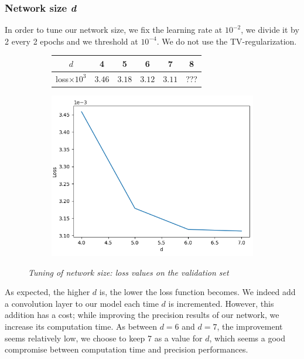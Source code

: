 \documentclass{article}
\begin{document}
        \subsubsection{Network size \textit{d}}
            \label{par:hpp-d}
            In order to tune our network size, we fix the learning rate at $10^{-2}$, we divide it by 2 every 2 epochs and we threshold at $10^{-4}$. We do not use the TV-regularization.

            \begin{figure}[!ht]
                \begin{subfigure}{.4\linewidth}
                    \centering
                    \begin{tabular}{|c|c|c|c|c|c|}
                        \hline
                        $d$ & 4 & 5 & 6 & 7 & 8 \\
                        \hline \hline
                        loss$\times 10^3$ & $3.46$ & $3.18$ & $3.12$ & $3.11$ & ??? \\
                        \hline
                    \end{tabular}
                \end{subfigure}
                \begin{subfigure}{.59\linewidth}
                    \centering
                    \includegraphics[width=.8\linewidth]{pics/hpp-d.png}
                \end{subfigure}
                \caption{\textit{Tuning of network size: loss values on the validation set}}
            \end{figure}
            \par
            As expected, the higher $d$ is, the lower the loss function becomes. We indeed add a convolution layer to our model each time $d$ is incremented. However, this addition has a cost; while improving the precision results of our network, we increase its computation time. As between $d=6$ and $d=7$, the improvement seems relatively low, we choose to keep 7 as a value for $d$, which seems a good compromise between computation time and precision performances.
\end{document}
